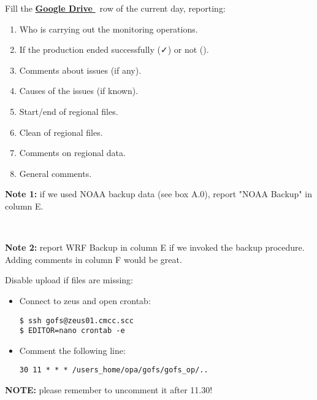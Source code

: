 \documentclass[twocolumn,8pt]{article}
\begin{document}
\begin{mdframed}[frametitle=(C)\ -- At 9 am\hfill\faSunO]

Fill the \href{https://docs.google.com/spreadsheets/d/1XrbzNdr-K6jtwD-tTdRAlaO6S9hy3aSgxQ-OCmYEfL0/edit#gid=1550543264}{\textbf{Google Drive \faExternalLink}}\ row of the current day, reporting:
\vspace{-5pt}
\begin{enumerate}[col.\ A:\ , left=0.25cm, start=3,align=parleft]\itemsep0pt
    \item Who is carrying out the monitoring operations.
    \item If the production ended successfully (\faCheck) or not (\faTimes).
    \item Comments about issues (if any).
    \item Causes of the issues (if known).
    \addtocounter{enumi}{1}
    \item Start/end of regional files.
    \item Clean of regional files.
    \item Comments on regional data.
    \item General comments.
\end{enumerate}

\textbf{Note 1:} if we used NOAA backup data (see box A.0), report "NOAA Backup" in column E.

\

\textbf{Note 2:} report WRF Backup in column E if we invoked the backup procedure. Adding comments in column F would be great.

\end{mdframed} 

\begin{mdframed}[frametitle=(D)\ -- Before 11.30 am\hfill\faSunO]

Disable upload if files are missing:
\vspace{-5pt}
\begin{itemize}\itemsep0pt
    \item Connect to zeus and open crontab:
\begin{lstlisting}
$ ssh gofs@zeus01.cmcc.scc
$ EDITOR=nano crontab -e
    \end{lstlisting}
    
    \item Comment the following line:
    \begin{lstlisting}
30 11 * * * /users_home/opa/gofs/gofs_op/..
    \end{lstlisting}
\end{itemize}

\textbf{NOTE:} please remember to uncomment it after 11.30!

\end{mdframed} 
\end{document}
